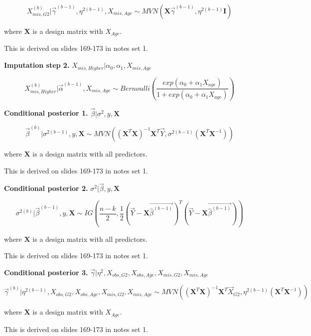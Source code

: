 \documentclass[11pt]{article}
\begin{document}
$$X_{mis, G2}^{(b)}|\vec\gamma^{(b - 1)}, \eta^{2(b - 1)}, X_{mis, Age} \sim MVN(\mathbf{X}\vec{\gamma}^{(b - 1)}, \eta^{2(b - 1)}\mathbf{I})$$

where $\mathbf{X}$ is a design matrix with $X_{Age}$.

This is derived on slides 169-173 in notes set 1.

\vspace{0.25in}

\textbf{Imputation step 2.} $X_{mis, Higher}|\alpha_0, \alpha_1, X_{mis, Age}$

$$X_{mis, Higher}^{(b)}|\vec\alpha^{(b - 1)}, X_{mis, Age} \sim Bernoulli\left(\frac{exp(\alpha_0 + \alpha_1X_{age})}{1 + exp(\alpha_0 + \alpha_1X_{age})}\right)$$

\textbf{Conditional posterior 1.} $\vec\beta | \sigma^2, y, \mathbf{X}$

$$\vec\beta^{(b)} | \sigma^{2(b - 1)}, y, \mathbf{X} \sim MVN((\mathbf{X}^T\mathbf{X})^{-1}\mathbf{X}^T\vec{Y}, \sigma^{2(b - 1)}(\mathbf{X}^T\mathbf{X}^{-1}))$$

where $\mathbf{X}$ is a design matrix with all predictors.

This is derived on slides 169-173 in notes set 1.

\vspace{0.25in}

\textbf{Conditional posterior 2.} $\sigma^2 | \vec\beta, y, \mathbf{X}$

$$\sigma^{2(b)} | \vec\beta^{(b - 1)}, y, \mathbf{X} \sim IG\left(\frac{n - k}{2}, \frac{1}{2}(\vec{Y} - \mathbf{X}\vec{\hat\beta^{(b - 1)}})^T(\vec{Y} - \mathbf{X}\vec{\hat\beta^{(b - 1)}})\right)$$

where $\mathbf{X}$ is a design matrix with all predictors.

This is derived on slides 169-173 in notes set 1.

\vspace{0.25in}

\textbf{Conditional posterior 3.} $\vec{\gamma}|\eta^2, X_{obs, G2}, X_{obs, Age}, X_{mis, G2}, X_{mis, Age}$

$$\vec{\gamma}^{(b)}|\eta^{2(b - 1)}, X_{obs, G2}, X_{obs, Age}, X_{mis, G2}, X_{mis, Age} \sim MVN((\mathbf{X}^T\mathbf{X})^{-1}\mathbf{X}^T\vec{X}_{G2}, \eta^{2(b - 1)}(\mathbf{X}^T\mathbf{X}^{-1}))$$

where $\mathbf{X}$ is a design matrix with $X_{Age}$.

This is derived on slides 169-173 in notes set 1.
\end{document}
